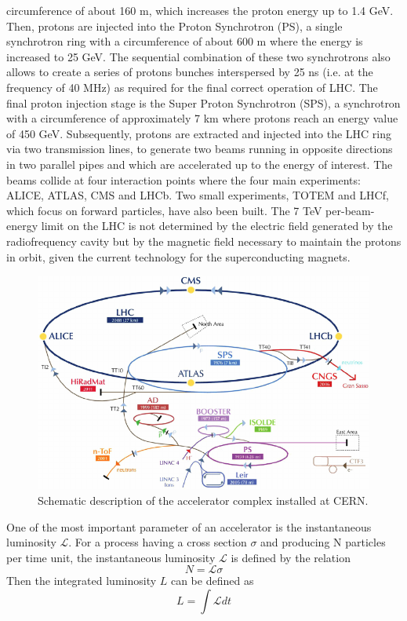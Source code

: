 circumference of about 160 m, which increases the proton energy up to 1.4 GeV. Then,
protons are injected into the Proton Synchrotron (PS), a single synchrotron ring with a
circumference of about 600 m where the energy is increased to 25 GeV. The sequential combination of these two synchrotrons also allows to create a series of protons bunches
interspersed by 25 ns (i.e. at the frequency of 40 MHz) as required for the final correct
operation of LHC. The final proton injection stage is the Super Proton Synchrotron (SPS),
a synchrotron with a circumference of approximately 7 km where protons reach an energy
value of 450 GeV. Subsequently, protons are extracted and injected into the LHC ring
via two transmission lines, to generate two beams running in opposite directions in two
parallel pipes and which are accelerated up to the energy of interest. The beams collide
at four interaction points where the four main experiments: ALICE, ATLAS, CMS and LHCb. Two small experiments, TOTEM and LHCf, which focus on forward particles, have also been built.
The 7 TeV per-beam-energy limit on the LHC
is not determined by the electric field generated by the radiofrequency cavity but by the
magnetic field necessary to maintain the protons in orbit, given the current technology
for the superconducting magnets.
\begin{figure}
\centering
\includegraphics[scale= 0.5]{../Cap2/lhc}
\caption{Schematic description of the accelerator complex installed at CERN.}
\label{lhc}
\end{figure}
One of the most important parameter of an accelerator is the instantaneous luminosity $\mathcal{L}$. For a process having a cross section $\sigma$ and producing N particles per time unit, the
instantaneous luminosity $\mathcal{L}$ is defined by the relation
\begin{equation}
N= \mathcal{L} \sigma \end{equation}
Then the integrated luminosity $L$ can be defined as
\begin{equation}
L=\int \mathcal{L}  dt \end{equation}


